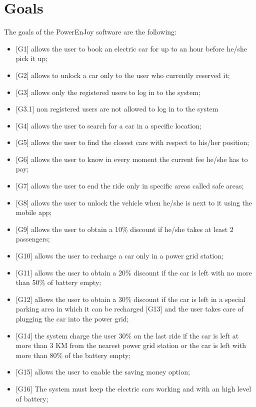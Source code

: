 \section{Goals}
The goals of the PowerEnJoy software are the following:
\begin{itemize}
	\item {[G1]} allows the user to book an electric car for up to an hour before he/she pick it up;
	\item {[G2]} allows to unlock a car only to the user who currently reserved it;
	\item {[G3]} allows only the registered users to log in to the system;
	\item {[G3.1]} non registered users are not allowed to log in to the system
	\item {[G4]} allows the user to search for a car in a specific location; 
	\item {[G5]} allows the user to find the closest cars with respect to his/her position; 
	\item {[G6]} allows the user to know in every moment the current fee he/she has to pay;
	\item {[G7]} allows the user to end the ride only in specific areas called safe areas;
	\item {[G8]} allows the user to unlock the vehicle when he/she is next to it using the mobile app;
	\item {[G9]} allows the user to obtain a 10\% discount if he/she takes at least 2 passengers;
	\item {[G10]} allows the user to recharge a car only in a power grid station;
	\item {[G11]} allows the user to obtain a 20\% discount if the car is left with no more than 50\% of battery empty;
	\item {[G12]} allows the user to obtain a 30\% discount if the car is left in a special parking area in which it can be recharged {[G13]} and the user takes care of plugging the car into the power grid;
	\item {[G14]} the system charge the user 30\% on the last ride if the car is left at more than 3 KM from the nearest power grid station or the car is left with more than 80\% of the battery empty;
	\item {[G15]} allows the user to enable the saving money option;
	\item {[G16]} The system must keep the electric cars working and with an high level of battery;
	
	
\end{itemize}
